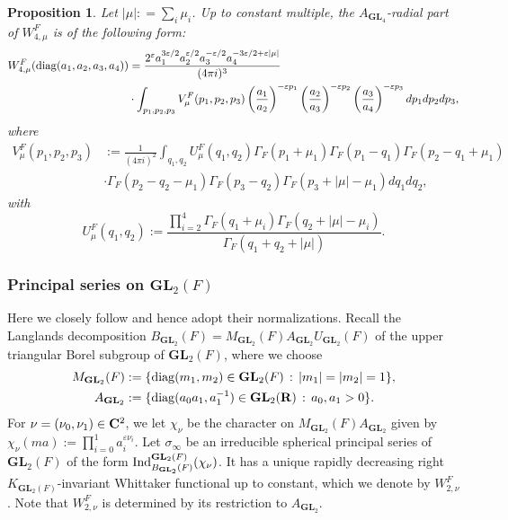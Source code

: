 \documentclass[11pt, reqno]{amsart}
\theoremstyle{plain}
\newtheorem{proposition}[theorem]{Proposition}
\theoremstyle{definition}
\theoremstyle{remark}
\theoremstyle{plain}
\def\C{{\bf C}}
\def\R{{\bf R}}
\def\epsilon{\varepsilon}
\def\GL{\mathbf{GL}}
\begin{document}
\begin{proposition}{\cite[Proposition 3.4]{IshiiMultivariate}}\label{WhittakerSphericalForGL4} Let $| \mu| : = \sum_i \mu_i$. Up to constant multiple, the $A_{\GL_4}$-radial part of $W_{4,\mu}^F$ is of the following form:
\begin{align*}
    W_{4,\mu}^F({\rm diag}(a_1,a_2,a_3,a_4)) &= \frac{2^{ \epsilon} a_1^{3 \epsilon/2} a_2^{\epsilon/2} a_3^{- \epsilon/2} a_4^{-3 \epsilon/2 + \epsilon|\mu|} }{(4 \pi i)^3}  \\ &\cdot \int_{p_1,p_2,p_3} V_\mu^F(p_1,p_2,p_3) \left(\frac{a_1}{a_2} \right)^{-\epsilon p_1}\left(\frac{a_2}{a_3} \right)^{-\epsilon p_2}\left(\frac{a_3}{a_4} \right)^{-\epsilon p_3} dp_1 dp_2 dp_3,
\end{align*}
    where 
    \begin{align*}
   V_\mu^F(p_1,p_2,p_3) &:= \frac{1}{(4 \pi i)^2} \int_{q_1,q_2} U_\mu^F(q_1,q_2) \Gamma_F(p_1 + \mu_1)\Gamma_F(p_1 - q_1)\Gamma_F(p_2 -q_1 + \mu_1)  \\ & \cdot \Gamma_F(p_2 -q_2 - \mu_1)\Gamma_F(p_3 - q_2)\Gamma_F(p_3 + |\mu| - \mu_1) dq_1 dq_2,
\end{align*}
with $$U_\mu^F(q_1,q_2) := \frac{\prod_{i=2}^4 \Gamma_F(q_1 +\mu_i)\Gamma_F(q_2+|\mu|-\mu_i)}{\Gamma_F(q_1 + q_2 +|\mu|)}.$$
\end{proposition}

\subsubsection{Principal series on $\GL_2(F)$}\label{subsec:Principal_GL2}
Here we closely follow \cite[\S 2]{IshiiMultivariate} and hence adopt their normalizations. Recall the Langlands decomposition $B_{\GL_2}(F) = M_{\GL_2}(F) A_{\GL_2} U_{\GL_2}(F)$ of the upper triangular Borel subgroup of $\GL_2(F)$, where we choose \begin{align*}
    M_{\GL_2}(F) &:= \{{\rm diag}(m_1,m_2)\in \GL_2(F)\,:\, |m_1|=|m_2| = 1\}, \\
     A_{\GL_2} &:= \{{\rm diag}(a_0a_1,a_1^{-1})\in \GL_2(\R)\,:\, a_0,a_1> 0 \}.
\end{align*} 
For $\nu=(\nu_0,\nu_1) \in \C^2$, we let $\chi_\nu$ be the character on $M_{\GL_2}(F) A_{\GL_2}$ given by $\chi_\nu(m a) := \prod_{i=0}^1 a_i^{\epsilon \nu_i}$. Let $\sigma_\infty$ be an irreducible spherical principal series of $\GL_2(F)$ of the form ${\rm Ind}_{B_{\GL_2}(F)}^{\GL_2(F)}(\chi_{\nu})$. It has a unique rapidly decreasing right $K_{\GL_2(F)}$-invariant Whittaker functional up to constant, which we denote by $W_{2,\nu}^F$. Note that $W_{2,\nu}^F$  is determined by its restriction to $A_{\GL_2}$. 
\end{document}
